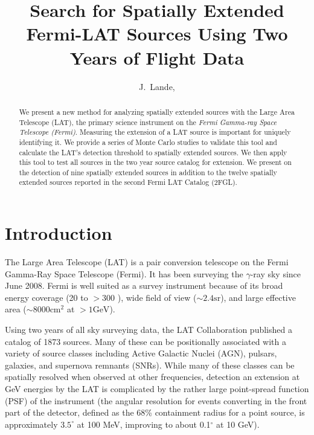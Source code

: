 \documentclass[12pt,preprint]{aastex}
\newcommand{\mev}{\text{MeV}\xspace}
\newcommand{\gev}{\text{GeV}\xspace}
\newcommand{\sr}{\text{sr}\xspace}
\newcommand{\cm}{\text{cm}\xspace}
\begin{document}
\title{Search for Spatially Extended Fermi-LAT Sources Using Two Years of Flight
Data}

\author{
J.~Lande, 
}


\begin{abstract}
We present a new method for analyzing spatially extended sources with
the Large Area Telescope (LAT), the primary science instrument on the
{\em Fermi Gamma-ray Space Telescope (Fermi)}. Measuring the extension
of a LAT source is important for uniquely identifying it.  We provide
a series of Monte Carlo studies to validate this tool and calculate
the LAT's detection threshold to spatially extended sources.  We then
apply this tool to test all sources in the two year source catalog for
extension. We present on the detection of nine spatially extended sources
in addition to the twelve spatially extended sources reported in the
second Fermi LAT Catalog (2FGL).
\end{abstract}

\listoftodos

\section{Introduction}

The Large Area Telescope (LAT) is a pair conversion telescope on the
Fermi Gamma-Ray Space Telescope (Fermi). It has been surveying the
$\gamma$-ray sky since June 2008.  Fermi is well suited as a survey
instrument because of its broad energy coverage (20 \mev to $>300$
\gev), wide field of view ($\sim 2.4 \sr$), and large effective area
($\sim 8000 \cm^2$ at $>1 \gev$).

Using two years of all sky surveying data, the LAT Collaboration
published a catalog of 1873 \gev sources\cite{second_cat}. Many of these can
be positionally associated with a variety of source classes including
Active Galactic Nuclei (AGN), pulsars, galaxies, and supernova
remnants (SNRs).  While many of these classes can be spatially
resolved when observed at other frequencies, detection an extension at
GeV energies by the LAT is complicated by the rather large
point-spread function (PSF) of the instrument (the angular resolution
for events converting in the front part of the detector, defined as
the 68\% containment radius for a point source, is approximately
$3.5^{\circ}$ at 100 MeV, improving to about 0.1$^{\circ}$ at 10 GeV).
\end{document}
